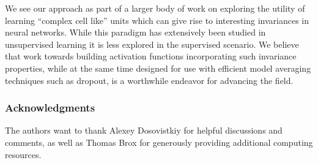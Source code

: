 \documentclass{article} \pdfoutput=1
\begin{document}
We see our approach as part of a larger body of work on exploring the
utility of learning ``complex cell like'' units which can give rise to
interesting invariances in neural networks. While this paradigm has
extensively been studied in unsupervised learning it is less explored
in the supervised scenario. We believe that work towards building
activation functions incorporating such invariance properties, while
at the same time designed for use with efficient model averaging
techniques such as dropout, is a worthwhile endeavor for advancing the
field.

\subsubsection*{Acknowledgments}
The authors want to thank Alexey Dosovistkiy for helpful discussions
and comments, as well as Thomas Brox for generously providing additional computing
resources.
\end{document}
